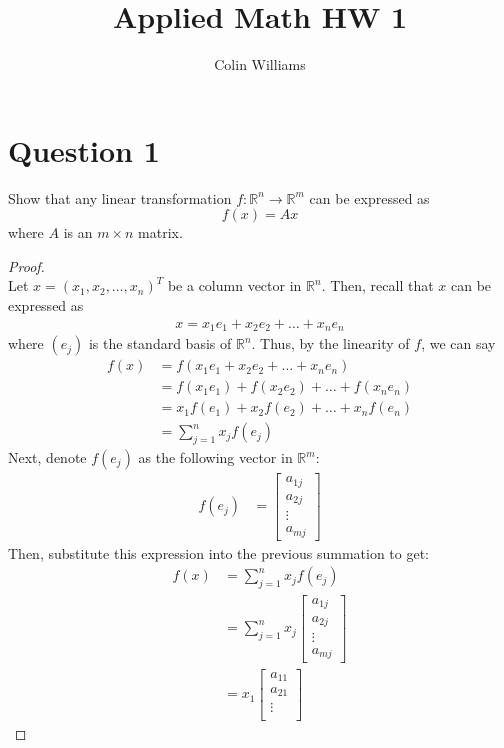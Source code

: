 \documentclass[10pt,a4paper]{article}
\title{Applied Math HW 1}
\author{Colin Williams}
\theoremstyle{definition}
\theoremstyle{definition}
\numberwithin{equation}{section}
\begin{document}
\maketitle

\section*{Question 1}
Show that any linear transformation $f: \mathbb{R}^n \to \mathbb{R}^m$ can be expressed as $$f(x) = Ax$$ where $A$ is an $m \times n$ matrix. 

\begin{proof}$ $
\\Let $x = (x_1, x_2, \ldots, x_n)^T$ be a column vector in $\mathbb{R}^n$. Then, recall that $x$ can be expressed as
\begin{align*}
x = x_1e_1 + x_2e_2 + \ldots + x_ne_n
\end{align*}
where $(e_j)$ is the standard basis of $\mathbb{R}^n$. Thus, by the linearity of $f$, we can say
\begin{align*}
f(x) &= f(x_1e_1 + x_2e_2 + \ldots + x_ne_n)\\
&= f(x_1e_1) + f(x_2e_2) + \ldots + f(x_ne_n)\\
&= x_1f(e_1) + x_2f(e_2) + \ldots + x_nf(e_n)\\
&= \sum_{j = 1}^n x_jf(e_j)
\end{align*}
Next, denote $f(e_j)$ as the following vector in $\mathbb{R}^m$:
\begin{align*}
f(e_j) &= \begin{bmatrix}
a_{1j}\\
a_{2j}\\
\vdots\\
a_{mj}
\end{bmatrix}
\end{align*}
Then, substitute this expression into the previous summation to get:
\begin{align*}
f(x) &= \sum_{j = 1}^n x_jf(e_j)\\
&= \sum_{j = 1}^n x_j \begin{bmatrix}
a_{1j}\\
a_{2j}\\
\vdots\\
a_{mj}
\end{bmatrix}\\
&= x_1 \begin{bmatrix}
a_{11}\\
a_{21}\\
\vdots\\

\end{bmatrix}
\end{align*}
\end{proof}
\end{document}
